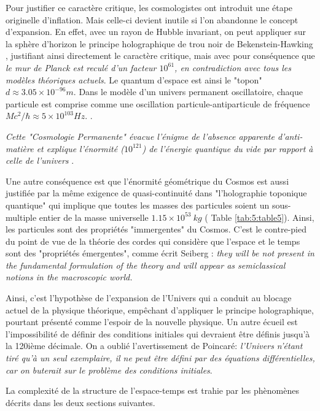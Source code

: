 \documentclass[a4paper,9pt]{article}
\begin{document}
Pour justifier ce caractère critique, les cosmologistes ont introduit une étape originelle d'inflation. Mais celle-ci devient inutile si l'on abandonne le concept d'expansion. En effet, avec un rayon de Hubble invariant, on peut appliquer sur la sphère d'horizon le principe holographique de trou noir de Bekenstein-Hawking \cite{Sanchez2}, justifiant ainsi directement le caractère critique, mais avec pour conséquence que \textit{le mur de Planck est reculé d'un facteur $10^{61}$, en contradiction avec tous les modèles théoriques actuels}. Le quantum d'espace est ainsi le "topon" $d \approx 3.05 \times 10^{-96} m$. Dans le modèle d'un univers permanent oscillatoire, chaque particule est comprise comme une oscillation particule-antiparticule de fréquence $Mc^2/\hbar \approx 5\times 10^{103} Hz$. \cite{Sanchez5}.


\textit{Cette "Cosmologie Permanente" évacue l'énigme de l'absence apparente d'anti-matière et explique l'énormité ($10^{121}$) de l'énergie quantique du vide par rapport à celle de l'univers} \cite{Sanchez2}.

Une autre conséquence est que l'énormité géométrique du Cosmos est aussi justifiée par la même exigence de quasi-continuité dans "l'holographie toponique quantique" qui implique que toutes les masses des particules soient un sous-multiple entier de la masse universelle $1.15 \times 10^{53}~ kg$ ( Table \ref{tab:5:table5}). Ainsi, les particules sont des propriétés "immergentes" du Cosmos. C'est le contre-pied du point de vue de la théorie des cordes qui considère que l'espace et le temps sont des  "propriétés émergentes", comme écrit Seiberg \cite {Seiberg}: \textit{they will be not present in the fundamental formulation of the theory and will appear as semiclassical notions in the macroscopic world.}


Ainsi, c'est l'hypothèse de l'expansion de l'Univers qui a conduit au blocage actuel de la physique théorique, emp\^echant d'appliquer le principe holographique, pourtant présenté comme l'espoir de la nouvelle physique. Un autre écueil est l'impossibilité de définir des conditions initiales qui devraient être définis jusqu'à la 120ième décimale. On a oublié l'avertissement de Poincaré: \cite{Poincare1} \textit{l'Univers n'étant tiré qu'à un seul exemplaire, il ne peut être défini par des équations différentielles, car on buterait sur le problème des conditions initiales}.


La complexité de la structure de l'espace-temps est trahie par les phènomènes décrits dans les deux sections suivantes. 
\end{document}
